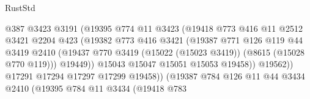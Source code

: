 \begin{lexlean}{RustStd}
\begin{coremodule}
                                      @387
                                      @3423
                                      @3191
                                      (@19395
                                        @774
                                        @11
                                        @3423
                                        (@19418
                                          @773
                                          @416
                                          @11
                                          @2512
                                          @3421
                                          @2204
                                          @423
                                          (@19382
                                            @773
                                            @416
                                            @3421
                                            (@19387
                                              @771
                                              @126
                                              @119
                                              @44
                                              @3419
                                              @2410
                                              (@19437
                                                @770
                                                @3419
                                                (@15022 (@15023 @3419))
                                                (@8615 (@15028 @770 @119)))
                                              @19449))
                                          @15043
                                          @15047
                                          @15051
                                          @15053
                                          @19458))
                                      @19562))
                                  @17291
                                  @17294
                                  @17297
                                  @17299
                                  @19458))
                              (@19387
                                @784
                                @126
                                @11
                                @44
                                @3434
                                @2410
                                (@19395
                                  @784
                                  @11
                                  @3434
                                  (@19418
                                    @783

\end{coremodule}
\end{lexlean}
